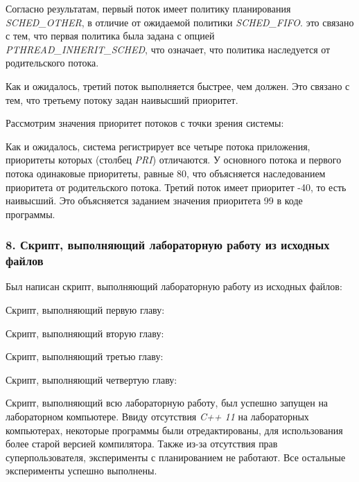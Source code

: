 \documentclass[14pt,a4paper,report]{report}
\begin{document}
Согласно результатам, первый поток имеет политику планирования \emph{SCHED\_OTHER}, в отличие от ожидаемой политики \emph{SCHED\_FIFO}. это связано с тем, что первая политика была задана с опцией \emph{PTHREAD\_INHERIT\_SCHED}, что означает, что политика наследуется от родительского потока. 

Как и ожидалось, третий поток выполняется быстрее, чем должен. Это связано с тем, что третьему потоку задан наивысший приоритет.  

Рассмотрим значения приоритет потоков с точки зрения системы:



Как и ожидалось, система регистрирует все четыре потока приложения, приоритеты которых (столбец \emph{PRI}) отличаются. У основного потока и первого потока одинаковые приоритеты, равные 80, что объясняется наследованием приоритета от родительского потока. Третий поток имеет приоритет -40, то есть наивысший. Это объясняется заданием значения приоритета 99 в коде программы.

\subsubsection{8. Скрипт, выполняющий лабораторную работу из исходных файлов}

Был написан скрипт, выполняющий лабораторную работу из исходных файлов:



Скрипт, выполняющий первую главу:



Скрипт, выполняющий вторую главу:



Скрипт, выполняющий третью главу:



Скрипт, выполняющий четвертую главу:



Скрипт, выполняющий всю лабораторную работу, был успешно запущен на лабораторном компьютере. Ввиду отсутствия \emph{C++ 11} на лабораторных компьютерах, некоторые программы были отредактированы, для использования более старой версией компилятора. Также из-за отсутствия прав суперпользователя, эксперименты с планированием не работают. Все остальные эксперименты успешно выполнены.
\end{document}
